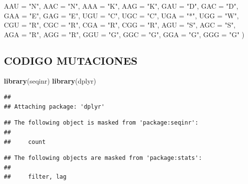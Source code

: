 \documentclass[
]{article}
\newenvironment{Shaded}{\begin{snugshade}}{\end{snugshade}}
\newcommand{\AttributeTok}[1]{\textcolor[rgb]{0.13,0.29,0.53}{#1}}
\newcommand{\FunctionTok}[1]{\textcolor[rgb]{0.13,0.29,0.53}{\textbf{#1}}}
\newcommand{\NormalTok}[1]{#1}
\newcommand{\StringTok}[1]{\textcolor[rgb]{0.31,0.60,0.02}{#1}}
\begin{document}
\begin{Shaded}
\begin{Highlighting}[]
  \AttributeTok{AAU =} \StringTok{"N"}\NormalTok{, }\AttributeTok{AAC =} \StringTok{"N"}\NormalTok{, }\AttributeTok{AAA =} \StringTok{"K"}\NormalTok{, }\AttributeTok{AAG =} \StringTok{"K"}\NormalTok{,}
  \AttributeTok{GAU =} \StringTok{"D"}\NormalTok{, }\AttributeTok{GAC =} \StringTok{"D"}\NormalTok{, }\AttributeTok{GAA =} \StringTok{"E"}\NormalTok{, }\AttributeTok{GAG =} \StringTok{"E"}\NormalTok{,}
  \AttributeTok{UGU =} \StringTok{"C"}\NormalTok{, }\AttributeTok{UGC =} \StringTok{"C"}\NormalTok{, }\AttributeTok{UGA =} \StringTok{"*"}\NormalTok{, }\AttributeTok{UGG =} \StringTok{"W"}\NormalTok{,}
  \AttributeTok{CGU =} \StringTok{"R"}\NormalTok{, }\AttributeTok{CGC =} \StringTok{"R"}\NormalTok{, }\AttributeTok{CGA =} \StringTok{"R"}\NormalTok{, }\AttributeTok{CGG =} \StringTok{"R"}\NormalTok{,}
  \AttributeTok{AGU =} \StringTok{"S"}\NormalTok{, }\AttributeTok{AGC =} \StringTok{"S"}\NormalTok{, }\AttributeTok{AGA =} \StringTok{"R"}\NormalTok{, }\AttributeTok{AGG =} \StringTok{"R"}\NormalTok{,}
  \AttributeTok{GGU =} \StringTok{"G"}\NormalTok{, }\AttributeTok{GGC =} \StringTok{"G"}\NormalTok{, }\AttributeTok{GGA =} \StringTok{"G"}\NormalTok{, }\AttributeTok{GGG =} \StringTok{"G"}
\NormalTok{)}
\end{Highlighting}
\end{Shaded}

\subsection{CODIGO MUTACIONES}\label{codigo-mutaciones}

\begin{Shaded}
\begin{Highlighting}[]
\FunctionTok{library}\NormalTok{(seqinr)}
\FunctionTok{library}\NormalTok{(dplyr)}
\end{Highlighting}
\end{Shaded}

\begin{verbatim}
## 
## Attaching package: 'dplyr'
\end{verbatim}

\begin{verbatim}
## The following object is masked from 'package:seqinr':
## 
##     count
\end{verbatim}

\begin{verbatim}
## The following objects are masked from 'package:stats':
## 
##     filter, lag
\end{verbatim}
\end{document}
